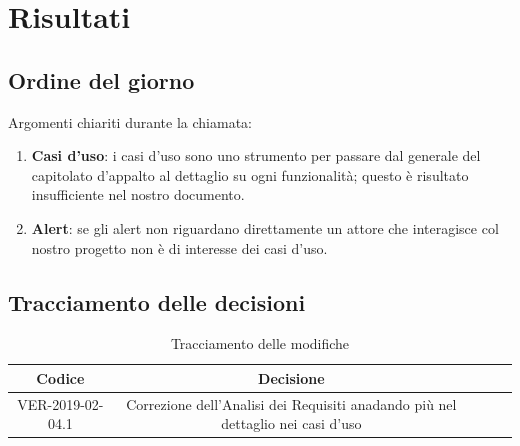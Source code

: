 \documentclass{article}
\begin{document}
\section{Risultati}
    \subsection{Ordine del giorno}
    Argomenti chiariti durante la chiamata:
    \begin{enumerate}
        \item \textbf{Casi d'uso}: i casi d'uso sono uno strumento per passare dal generale del capitolato d'appalto al dettaglio su ogni funzionalità; questo è risultato insufficiente nel nostro documento.
        \item \textbf{Alert}: se gli alert non riguardano direttamente un attore che interagisce col nostro progetto non è di interesse dei casi d'uso.
    \end{enumerate}
    
    \subsection{Tracciamento delle decisioni}
    \begin{table}[!h] %
            \centering
            \renewcommand{\arraystretch}{2}
            \begin{tabular}{|c|c|p{6cm}|l|l|} %
                \rowcolor{orange!50} %
        		\hline
        		\textbf{Codice} & \textbf{Decisione}\\
                \hline
                VER-2019-02-04.1 & Correzione dell'Analisi dei Requisiti anadando più nel dettaglio nei casi d'uso\\
                \hline

        \end{tabular}
        \caption{Tracciamento delle modifiche} %
        \label{tab:Tracciamento delle modifiche}
        \end{table}
    
\end{document}
